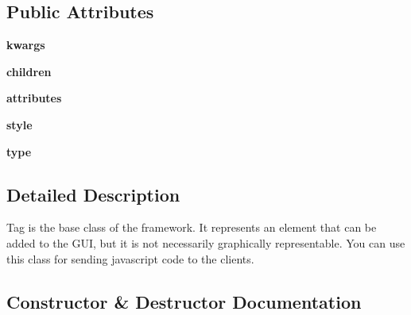 \subsection*{Public Attributes}
\begin{DoxyCompactItemize}
\item 
{\bfseries kwargs}\hypertarget{classremi_1_1gui_1_1Tag_a09ce2f5842617f4969b949a86f8c9558}{}\label{classremi_1_1gui_1_1Tag_a09ce2f5842617f4969b949a86f8c9558}

\item 
{\bfseries children}\hypertarget{classremi_1_1gui_1_1Tag_a21f2d5b2c5badfefc782f9794372d272}{}\label{classremi_1_1gui_1_1Tag_a21f2d5b2c5badfefc782f9794372d272}

\item 
{\bfseries attributes}\hypertarget{classremi_1_1gui_1_1Tag_a9e7abb0e2f523828dad7ee7847a8e2a1}{}\label{classremi_1_1gui_1_1Tag_a9e7abb0e2f523828dad7ee7847a8e2a1}

\item 
{\bfseries style}\hypertarget{classremi_1_1gui_1_1Tag_aff7af5b286e58446dfe4db4297760ecd}{}\label{classremi_1_1gui_1_1Tag_aff7af5b286e58446dfe4db4297760ecd}

\item 
{\bfseries type}\hypertarget{classremi_1_1gui_1_1Tag_a8eb08155f75a298d7879d8935973f77d}{}\label{classremi_1_1gui_1_1Tag_a8eb08155f75a298d7879d8935973f77d}

\end{DoxyCompactItemize}


\subsection{Detailed Description}
\begin{DoxyVerb}Tag is the base class of the framework. It represents an element that can be added to the GUI,
but it is not necessarily graphically representable.
You can use this class for sending javascript code to the clients.
\end{DoxyVerb}
 

\subsection{Constructor \& Destructor Documentation}
